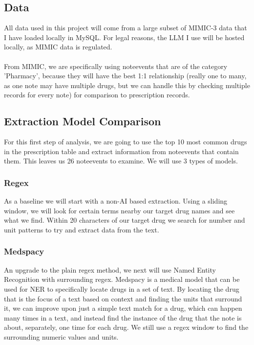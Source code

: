 \documentclass[sigconf,nonacm]{acmart} %
\begin{document}
\subsection{Data}
All data used in this project will come from a large subset of MIMIC-3 data that I have loaded locally in MySQL. For legal reasons, the LLM I use will be hosted locally, as MIMIC data is regulated.
\\\\From MIMIC, we are specifically using noteevents that are of the category 'Pharmacy', because they will have the best 1:1 relationship (really one to many, as one note may have multiple drugs, but we can handle this by checking multiple records for every note) for comparison to prescription records.

\subsection{Extraction Model Comparison}
For this first step of analysis, we are going to use the top 10 most common drugs in the prescription table and extract information from noteevents that contain them. This leaves us 26 noteevents to examine. We will use 3 types of models.

\subsubsection{Regex}
As a baseline we will start with a non-AI based extraction. Using a sliding window, we will look for certain terms nearby our target drug names and see what we find. Within 20 characters of our target drug we search for number and unit patterns to try and extract data from the text.

\subsubsection{Medspacy}
An upgrade to the plain regex method, we next will use Named Entity Recognition with surrounding regex. Medspacy is a medical model that can be used for NER to specifically locate drugs in a set of text. By locating the drug that is the focus of a text based on context and finding the units that surround it, we can improve upon just a simple text match for a drug, which can happen many times in a text, and instead find the instance of the drug that the note is about, separately, one time for each drug. We still use a regex window to find the surrounding numeric values and units.
\end{document}
